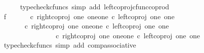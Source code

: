 \begin{isabellebody}
\ \ \ \ \isamarkupfalse%
\ {\isacharparenleft}{\kern0pt}typecheck{\isacharunderscore}{\kern0pt}cfuncs{\isacharcomma}{\kern0pt}\ simp\ add{\isacharcolon}{\kern0pt}\ left{\isacharunderscore}{\kern0pt}coproj{\isacharunderscore}{\kern0pt}cfunc{\isacharunderscore}{\kern0pt}coprod{\isacharparenright}{\kern0pt}\isanewline
\ \ \isamarkupfalse%
\ f{}{\isacharcolon}{\kern0pt}\ {\isachardoublequoteopen}{\isasymlangle}{\isasymf}{\isacharcomma}{\kern0pt}\ {\isasymf}{\isasymrangle}\ {\isasymamalg}\ {\isasymlangle}{\isasymt}{\isacharcomma}{\kern0pt}{\isasymf}{\isasymrangle}\ {\isasymamalg}\ {\isasymlangle}{\isasymf}{\isacharcomma}{\kern0pt}{\isasymt}{\isasymrangle}\ {\isasymcirc}\isactrlsub c\ {\isacharparenleft}{\kern0pt}right{\isacharunderscore}{\kern0pt}coproj\ one\ {\isacharparenleft}{\kern0pt}one{\isasymCoprod}one{\isacharparenright}{\kern0pt}\ {\isasymcirc}\isactrlsub c\ left{\isacharunderscore}{\kern0pt}coproj\ one\ one{\isacharparenright}{\kern0pt}\ {\isacharequal}{\kern0pt}\ {\isasymlangle}{\isasymt}{\isacharcomma}{\kern0pt}{\isasymf}{\isasymrangle}{\isachardoublequoteclose}\isanewline
\ \ \isamarkupfalse%
{\isacharminus}{\kern0pt}\ \isanewline
\ \ \ \ \isamarkupfalse%
\ {\isachardoublequoteopen}{\isasymlangle}{\isasymf}{\isacharcomma}{\kern0pt}\ {\isasymf}{\isasymrangle}\ {\isasymamalg}\ {\isasymlangle}{\isasymt}{\isacharcomma}{\kern0pt}{\isasymf}{\isasymrangle}\ {\isasymamalg}\ {\isasymlangle}{\isasymf}{\isacharcomma}{\kern0pt}{\isasymt}{\isasymrangle}\ {\isasymcirc}\isactrlsub c\ right{\isacharunderscore}{\kern0pt}coproj\ one\ {\isacharparenleft}{\kern0pt}one{\isasymCoprod}one{\isacharparenright}{\kern0pt}\ {\isasymcirc}\isactrlsub c\ left{\isacharunderscore}{\kern0pt}coproj\ one\ one\ {\isacharequal}{\kern0pt}\ \isanewline
\ \ \ \ \ \ \ \ \ \ {\isacharparenleft}{\kern0pt}{\isasymlangle}{\isasymf}{\isacharcomma}{\kern0pt}\ {\isasymf}{\isasymrangle}\ {\isasymamalg}\ {\isasymlangle}{\isasymt}{\isacharcomma}{\kern0pt}{\isasymf}{\isasymrangle}\ {\isasymamalg}\ {\isasymlangle}{\isasymf}{\isacharcomma}{\kern0pt}{\isasymt}{\isasymrangle}\ {\isasymcirc}\isactrlsub c\ right{\isacharunderscore}{\kern0pt}coproj\ one\ {\isacharparenleft}{\kern0pt}one{\isasymCoprod}one{\isacharparenright}{\kern0pt}{\isacharparenright}{\kern0pt}\ {\isasymcirc}\isactrlsub c\ left{\isacharunderscore}{\kern0pt}coproj\ one\ one{\isachardoublequoteclose}\isanewline
\ \ \ \ \ \ \isamarkupfalse%
\ {\isacharparenleft}{\kern0pt}typecheck{\isacharunderscore}{\kern0pt}cfuncs{\isacharcomma}{\kern0pt}\ simp\ add{\isacharcolon}{\kern0pt}\ comp{\isacharunderscore}{\kern0pt}associative{}{\isacharparenright}{\kern0pt}\isanewline

\end{isabellebody}

